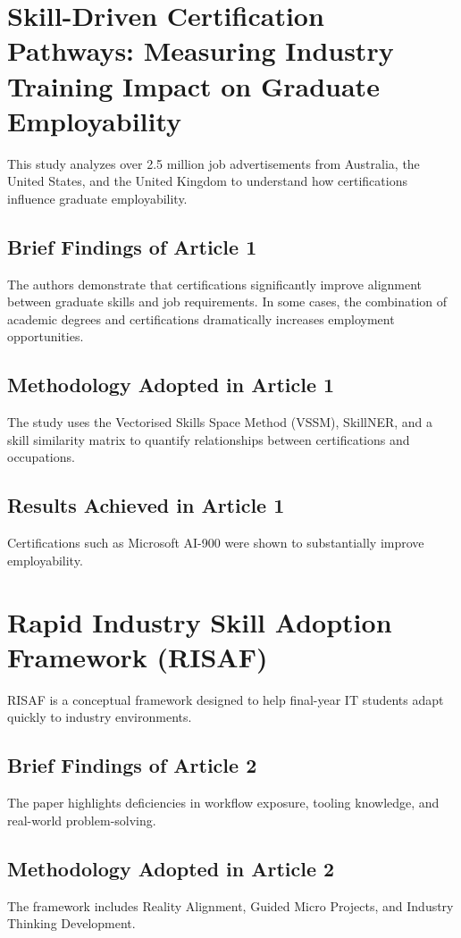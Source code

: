 \documentclass[12pt,a4paper]{report}
\begin{document}
\section{Skill-Driven Certification Pathways: Measuring Industry Training Impact on Graduate Employability}
\cite{kovalev2025skill}
\par
This study analyzes over 2.5 million job advertisements from Australia, the United States, and the United Kingdom to understand how certifications influence graduate employability.

\subsection{Brief Findings of Article 1}
The authors demonstrate that certifications significantly improve alignment between graduate skills and job requirements. In some cases, the combination of academic degrees and certifications dramatically increases employment opportunities.

\subsection{Methodology Adopted in Article 1}
The study uses the Vectorised Skills Space Method (VSSM), SkillNER, and a skill similarity matrix to quantify relationships between certifications and occupations.

\subsection{Results Achieved in Article 1}
Certifications such as Microsoft AI-900 were shown to substantially improve employability.

\section{Rapid Industry Skill Adoption Framework (RISAF)}
\cite{weerasuriya2026rapid}
\par
RISAF is a conceptual framework designed to help final-year IT students adapt quickly to industry environments.

\subsection{Brief Findings of Article 2}
The paper highlights deficiencies in workflow exposure, tooling knowledge, and real-world problem-solving.

\subsection{Methodology Adopted in Article 2}
The framework includes Reality Alignment, Guided Micro Projects, and Industry Thinking Development.
\end{document}
